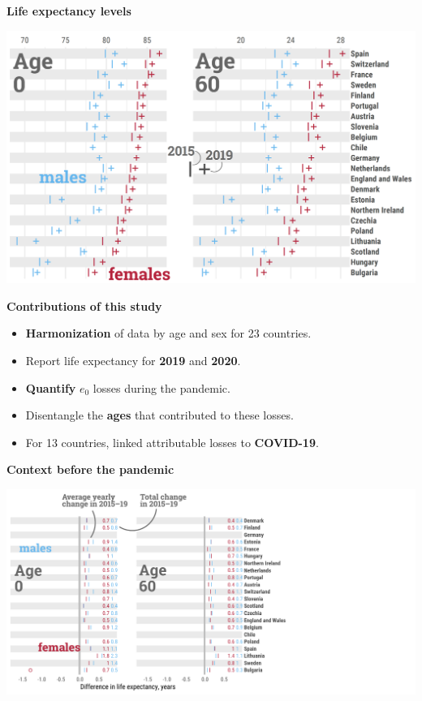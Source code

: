 \documentclass[xcolor={dvipsnames}]{beamer}
\begin{document}
\begin{frame}
\Large{
	\begin{center}
		\textbf{Life expectancy levels}
		
			\includegraphics[scale=.38]{Fig_levels}
	\end{center} 
}
\end{frame}

\begin{frame}
\Large{
	\begin{center}
		\textbf{Contributions of this study}
	\end{center} 
	\pause
	\begin{itemize}
	\item \textbf{Harmonization} of data by age and sex for 23 countries. \pause
	\item Report life expectancy for \textbf{2019} and \textbf{2020}. \pause
	\item \textbf{Quantify} $e_0$ losses during the pandemic. \pause
	\item Disentangle the \textbf{ages} that contributed to these losses. \pause
	\item For 13 countries, linked attributable losses to \textbf{COVID-19}.
	\end{itemize}
}
\end{frame}

\begin{frame}
\Large{
	\begin{center}
		\textbf{Context before the pandemic}
	\end{center} 
	\includegraphics[scale=.72]{fig-2-ann0}	
}
\end{frame}
\end{document}
